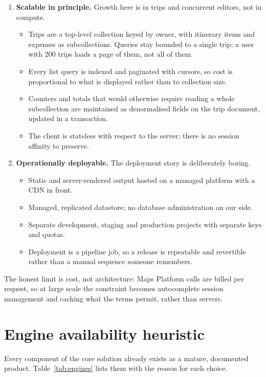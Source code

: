 \documentclass[11pt,a4paper]{article}
\begin{document}
\begin{enumerate}[leftmargin=0.7cm]
    \item \textbf{Scalable in principle.} Growth here
      is in trips and concurrent editors, not in
      compute.
    \begin{itemize}[leftmargin=0.7cm]
        \item Trips are a top-level collection keyed by
          owner, with itinerary items and expenses as
          subcollections. Queries stay bounded to a
          single trip; a user with 200 trips loads a
          page of them, not all of them.
        \item Every list query is indexed and paginated
          with cursors, so cost is proportional to what
          is displayed rather than to collection size.
        \item Counters and totals that would otherwise
          require reading a whole subcollection are
          maintained as denormalised fields on the trip
          document, updated in a transaction.
        \item The client is stateless with respect to
          the server; there is no session affinity to
          preserve.
    \end{itemize}

    \item \textbf{Operationally deployable.} The
      deployment story is deliberately boring.
    \begin{itemize}[leftmargin=0.7cm]
        \item Static and server-rendered output hosted
          on a managed platform with a CDN in front.
        \item Managed, replicated datastore; no
          database administration on our side.
        \item Separate development, staging and
          production projects with separate keys and
          quotas.
        \item Deployment is a pipeline job, so a
          release is repeatable and revertible rather
          than a manual sequence someone remembers.
    \end{itemize}
\end{enumerate}

The honest limit is cost, not architecture: Maps
Platform calls are billed per request, so at large
scale the constraint becomes autocomplete session
management and caching what the terms permit, rather
than servers.

\section{Engine availability heuristic}
Every component of the core solution already exists as
a mature, documented product. Table~\ref{tab:engines}
lists them with the reason for each choice.
\end{document}
